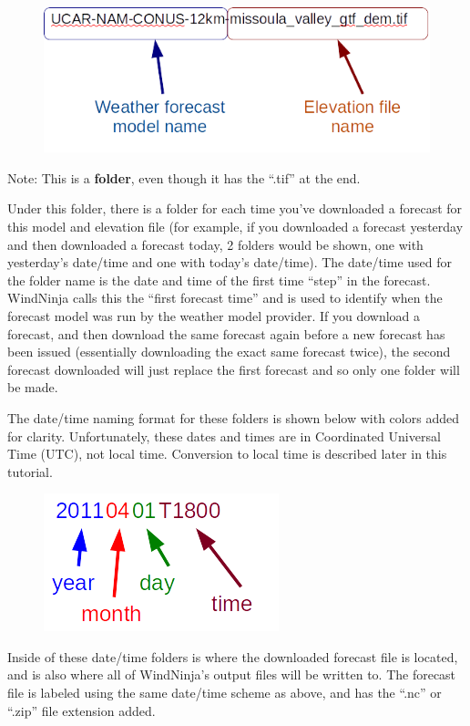 \documentclass[12pt]{article}
\begin{document}
\begin{figure}[H]
	\centering
	\includegraphics[scale=1.0]{fil_diag}
\end{figure}

Note:  This is a \textbf{folder}, even though it has the “.tif” at the end.

Under this folder, there is a folder for each time you've downloaded a forecast for this model and elevation file (for example, if you downloaded a forecast yesterday and then downloaded a forecast today, 2 folders would be shown, one with yesterday's date/time and one with today's date/time).  The date/time used for the folder name is the date and time of the first time “step” in the forecast.  WindNinja calls this the “first forecast time” and is used to identify when the forecast model was run by the weather model provider.  If you download a forecast, and then download the same forecast again before a new forecast has been issued (essentially downloading the exact same forecast twice), the second forecast downloaded will just replace the first forecast and so only one folder will be made.

The date/time naming format for these folders is shown below with colors added for clarity.  Unfortunately, these dates and times are in Coordinated Universal Time (UTC), not local time.  Conversion to local time is described later in this tutorial.

\begin{figure}[H]
	\centering
	\includegraphics[scale=1.0]{UTC_diag}
\end{figure}

Inside of these date/time folders is where the downloaded forecast file is located, and is also where all of WindNinja's output files will be written to.  The forecast file is labeled using the same date/time scheme as above, and has the “.nc” or “.zip” file extension added.
\end{document}
